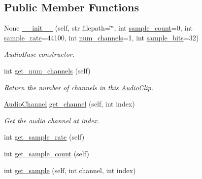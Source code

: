 \subsection*{Public Member Functions}
\begin{DoxyCompactItemize}
\item 
None \mbox{\hyperlink{classbridges_1_1audio__clip_1_1_audio_clip_a5848ac088c4d49a211d39be7e5d116e3}{\+\_\+\+\_\+init\+\_\+\+\_\+}} (self, str filepath=\char`\"{}\char`\"{}, int \mbox{\hyperlink{classbridges_1_1audio__clip_1_1_audio_clip_ac9551b041b0d6b7e7b2a1db623c56159}{sample\+\_\+count}}=0, int \mbox{\hyperlink{classbridges_1_1audio__clip_1_1_audio_clip_a265e017578bdd94664f308f51b596c6d}{sample\+\_\+rate}}=44100, int \mbox{\hyperlink{classbridges_1_1audio__clip_1_1_audio_clip_ace413dc6646f965e2d0f75e1d84000c9}{num\+\_\+channels}}=1, int \mbox{\hyperlink{classbridges_1_1audio__clip_1_1_audio_clip_a274e7ae8cd17a96d068265795b9c0718}{sample\+\_\+bits}}=32)
\begin{DoxyCompactList}\small\item\em Audio\+Base constructor. \end{DoxyCompactList}\item 
int \mbox{\hyperlink{classbridges_1_1audio__clip_1_1_audio_clip_ad04346faa0d3bcb18028847a2b9c8617}{get\+\_\+num\+\_\+channels}} (self)
\begin{DoxyCompactList}\small\item\em Return the number of channels in this \mbox{\hyperlink{classbridges_1_1audio__clip_1_1_audio_clip}{Audio\+Clip}}. \end{DoxyCompactList}\item 
\mbox{\hyperlink{classbridges_1_1audio__channel_1_1_audio_channel}{Audio\+Channel}} \mbox{\hyperlink{classbridges_1_1audio__clip_1_1_audio_clip_ac7fb49132209d4d581fff3009ba73c0f}{get\+\_\+channel}} (self, int index)
\begin{DoxyCompactList}\small\item\em Get the audio channel at index. \end{DoxyCompactList}\item 
int \mbox{\hyperlink{classbridges_1_1audio__clip_1_1_audio_clip_ac49ea461937e820dd318c05ec9c5d5c3}{get\+\_\+sample\+\_\+rate}} (self)
\item 
int \mbox{\hyperlink{classbridges_1_1audio__clip_1_1_audio_clip_a40db7a666d6312965c0a6fd4448b4a5f}{get\+\_\+sample\+\_\+count}} (self)
\item 
int \mbox{\hyperlink{classbridges_1_1audio__clip_1_1_audio_clip_a024523f9e67156818aa1c166f2f18fba}{get\+\_\+sample}} (self, int channel, int index)

\end{DoxyCompactItemize}

